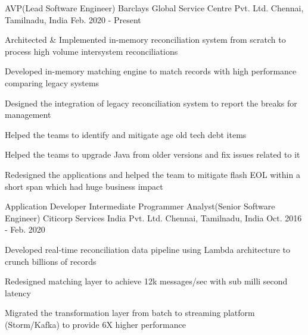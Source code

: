 

\begin{cventries}

  \cventry
    {AVP(Lead Software Engineer)} %
    {Barclays Global Service Centre Pvt. Ltd.} %
    {Chennai, Tamilnadu, India} %
    {Feb. 2020 - Present} %
    {
      \begin{cvitems} %
        \item {Architected \& Implemented in-memory reconciliation system from scratch to process high volume intersystem reconciliations}
        \item {Developed in-memory matching engine to match records with high performance comparing legacy systems}
        \item {Designed the integration of legacy reconciliation system to report the breaks for management}
        \item {Helped the teams to identify and mitigate age old tech debt items}
        \item {Helped the teams to upgrade Java from older versions and fix issues related to it}
        \item {Redesigned the applications and helped the team to mitigate flash EOL within a short span which had huge business impact}
      \end{cvitems}
    }
  \cventry
    {Application Developer Intermediate Programmer Analyst(Senior Software Engineer)} %
    {Citicorp Services India Pvt. Ltd.} %
    {Chennai, Tamilnadu, India} %
    {Oct. 2016 - Feb. 2020} %
    {
      \begin{cvitems} %
        \item {Developed real-time reconciliation data pipeline using Lambda architecture to crunch billions of records}
        \item {Redesigned matching layer to achieve 12k messages/sec with sub milli second latency}
        \item {Migrated the transformation layer from batch to streaming platform (Storm/Kafka) to provide 6X higher performance}

\end{cvitems}}
\end{cventries}
